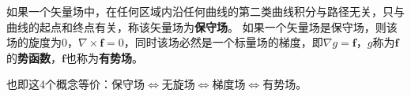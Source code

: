 \begin{definition}
如果一个矢量场中，在任何区域内沿任何曲线的第二类曲线积分与路径无关，只与曲线的起点和终点有关，称该矢量场为{\bf 保守场}。
如果一个矢量场是保守场，则该场的旋度为0，$\nabla \times \boldsymbol{f}=0$，同时该场必然是一个标量场的梯度，即$\nabla g=\boldsymbol{f}$，$g$称为$\boldsymbol{f}$的{\bf 势函数}，$\boldsymbol{f}$也称为{\bf 有势场}。
\end{definition}

也即这4个概念等价：保守场$\Leftrightarrow $无旋场$\Leftrightarrow $梯度场$\Leftrightarrow $有势场。




